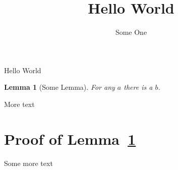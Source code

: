 \documentclass{article}
\newtheorem{lemma}{Lemma}
\begin{document}
\title{Hello World}
\author{Some One}
\maketitle
Hello World
\begin{lemma}[Some Lemma] \label{lem:some-lemma}
  For any $a$ there is a $b$.
\end{lemma}

More text

\section{Proof of Lemma~\ref{lem:some-lemma}}

Some more text
\end{document}
